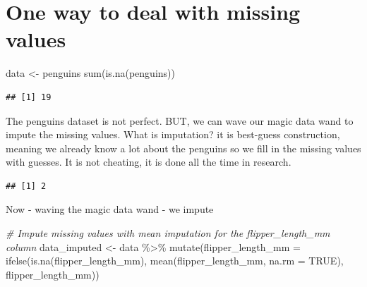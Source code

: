 \documentclass[
]{book}
\newenvironment{Shaded}{\begin{snugshade}}{\end{snugshade}}
\newcommand{\AttributeTok}[1]{\textcolor[rgb]{0.77,0.63,0.00}{#1}}
\newcommand{\CommentTok}[1]{\textcolor[rgb]{0.56,0.35,0.01}{\textit{#1}}}
\newcommand{\ConstantTok}[1]{\textcolor[rgb]{0.00,0.00,0.00}{#1}}
\newcommand{\FunctionTok}[1]{\textcolor[rgb]{0.00,0.00,0.00}{#1}}
\newcommand{\NormalTok}[1]{#1}
\newcommand{\OtherTok}[1]{\textcolor[rgb]{0.56,0.35,0.01}{#1}}
\newcommand{\SpecialCharTok}[1]{\textcolor[rgb]{0.00,0.00,0.00}{#1}}
\begin{document}
\hypertarget{one-way-to-deal-with-missing-values}{%
\section{One way to deal with missing
values}\label{one-way-to-deal-with-missing-values}}

\begin{Shaded}
\begin{Highlighting}[]
\NormalTok{data }\OtherTok{\textless{}{-}}\NormalTok{ penguins}
\FunctionTok{sum}\NormalTok{(}\FunctionTok{is.na}\NormalTok{(penguins))}
\end{Highlighting}
\end{Shaded}

\begin{verbatim}
## [1] 19
\end{verbatim}

The penguins dataset is not perfect. BUT, we can wave our magic data
wand to impute the missing values. What is imputation? it is best-guess
construction, meaning we already know a lot about the penguins so we
fill in the missing values with guesses. It is not cheating, it is done
all the time in research.

\begin{Shaded}
\end{Shaded}

\begin{verbatim}
## [1] 2
\end{verbatim}

Now - waving the magic data wand - we impute

\begin{Shaded}
\begin{Highlighting}[]
\CommentTok{\# Impute missing values with mean imputation for the \textquotesingle{}flipper\_length\_mm\textquotesingle{} column}
\NormalTok{data\_imputed }\OtherTok{\textless{}{-}}\NormalTok{ data }\SpecialCharTok{\%\textgreater{}\%}
  \FunctionTok{mutate}\NormalTok{(}\AttributeTok{flipper\_length\_mm =} \FunctionTok{ifelse}\NormalTok{(}\FunctionTok{is.na}\NormalTok{(flipper\_length\_mm), }
                                    \FunctionTok{mean}\NormalTok{(flipper\_length\_mm, }\AttributeTok{na.rm =} \ConstantTok{TRUE}\NormalTok{), }
\NormalTok{                                    flipper\_length\_mm))}
\end{Highlighting}
\end{Shaded}
\end{document}
